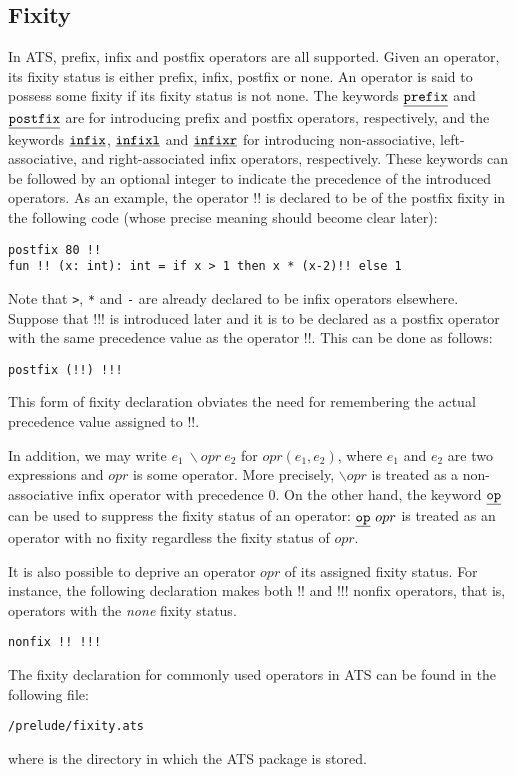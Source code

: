 \subsection{Fixity}
In ATS, prefix, infix and postfix operators are all supported. Given an
operator, its {fixity status} is either prefix, infix, postfix or none.  An
operator is said to possess some fixity if its fixity status is not none.
The keywords $\underline{\texttt{prefix}}$ and $\underline{\texttt{postfix}}$ are for introducing prefix and
postfix operators, respectively, and the keywords $\underline{\texttt{infix}}$, $\underline{\texttt{infixl}}$
and $\underline{\texttt{infixr}}$ for introducing non-associative, left-associative, and
right-associated infix operators, respectively. These keywords can be
followed by an optional integer to indicate the precedence of the
introduced operators.  As an example, the operator $!!$ is declared to be
of the postfix fixity in the following code (whose precise meaning should
become clear later):
\begin{verbatim}
postfix 80 !!
fun !! (x: int): int = if x > 1 then x * (x-2)!! else 1
\end{verbatim}
Note that \texttt{>}, \texttt{*} and \texttt{-} are already declared to be
infix operators elsewhere. Suppose that $!!!$ is introduced later and it is
to be declared as a postfix operator with the same precedence value as the
operator $!!$. This can be done as follows:
\begin{verbatim}
postfix (!!) !!!
\end{verbatim}
This form of fixity declaration obviates the need for remembering the
actual precedence value assigned to $!!$.

In addition, we may write $e_1~\backslash opr~e_2$ for $opr(e_1, e_2)$,
where $e_1$ and $e_2$ are two expressions and $opr$ is some operator. More
precisely, $\backslash opr$ is treated as a non-associative infix operator
with precedence $0$.  On the other hand, the keyword $\underline{\texttt{op}}$ can be used to
suppress the fixity status of an operator: $\underline{\texttt{op}}~opr$ is treated as an
operator with no fixity regardless the fixity status of $opr$.

It is also possible to deprive an operator $opr$ of its assigned fixity
status. For instance, the following declaration makes both $!!$ and $!!!$
nonfix operators, that is, operators with the {\it none} fixity status.
\begin{verbatim}
nonfix !! !!!
\end{verbatim}
The fixity declaration for commonly used operators in ATS can be found
in the following file:
\begin{center}
\texttt{\ATSHOME/prelude/fixity.ats}
\end{center}
where \texttt{\ATSHOME} is the directory in which the ATS package is stored.

